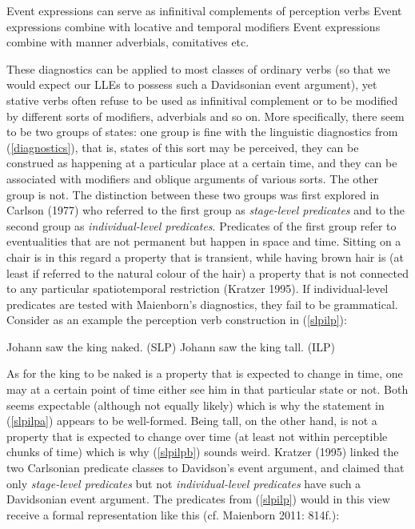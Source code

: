 \ea \label{diagnostics}
\ea Event expressions can serve as infinitival complements of perception verbs
\ex Event expressions combine with locative and temporal modifiers
\ex Event expressions combine with manner adverbials, comitatives etc.
\z
\z

These diagnostics can be applied to most classes of ordinary verbs (so that we would expect our LLEs to possess such a Davidsonian event argument), yet stative verbs often refuse to be used as infinitival complement or to be modified by different sorts of modifiers, adverbials and so on. More specifically, there seem to be two groups of states: one group is fine with the linguistic diagnostics from (\ref{diagnostics}), that is, states of this sort may be perceived, they can be construed as happening at a particular place at a certain time, and they can be associated with modifiers and oblique arguments of various sorts. The other group is not. The distinction between these two groups was first explored in Carlson (1977) who referred to the first group as \emph{stage-level predicates} and to the second group as \emph{individual-level predicates}. Predicates of the first group refer to eventualities that are not permanent but happen in space and time. Sitting on a chair is in this regard a property that is transient, while having brown hair is (at least if referred to the natural colour of the hair) a property that is not connected to any particular spatiotemporal restriction (Kratzer 1995). If individual-level predicates are tested with Maienborn's diagnostics, they fail to be grammatical. Consider as an example the perception verb construction in (\ref{slpilp}):

\ea \label{slpilp}
\ea Johann saw the king naked. (SLP) \label{slpilpa}
\ex \judge* Johann saw the king tall. (ILP) \label{slpilpb}
\z
\z

As for the king to be naked is a property that is expected to change in time, one may at a certain point of time either see him in that particular state or not. Both seems expectable (although not equally likely) which is why the statement in (\ref{slpilpa}) appears to be well-formed. Being tall, on the other hand, is not a property that is expected to change over time (at least not within perceptible chunks of time) which is why (\ref{slpilpb}) sounds weird. Kratzer (1995) linked the two Carlsonian predicate classes to Davidson's event argument, and claimed that only \emph{stage-level predicates} but not \emph{individual-level predicates} have such a Davidsonian event argument. The predicates from (\ref{slpilp}) would in this view receive a formal representation like this (cf. Maienborn 2011: 814f.):

